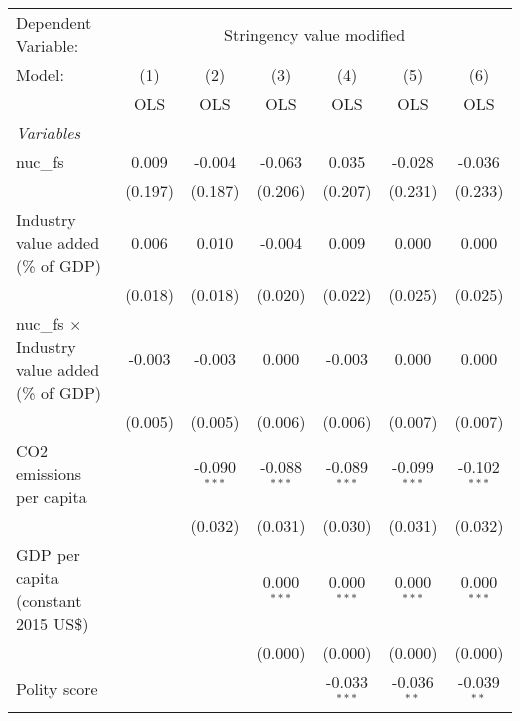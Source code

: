 
\begingroup
\centering
\begin{tabular}{lcccccc}
   \toprule
   Dependent Variable: & \multicolumn{6}{c}{Stringency value modified}\\
   Model:                                               & (1)     & (2)            & (3)            & (4)            & (5)            & (6)\\  
                                                        &  OLS    & OLS            & OLS            & OLS            & OLS            & OLS\\  
   \midrule
   \emph{Variables}\\
   nuc\_fs                                              & 0.009   & -0.004         & -0.063         & 0.035          & -0.028         & -0.036\\   
                                                        & (0.197) & (0.187)        & (0.206)        & (0.207)        & (0.231)        & (0.233)\\   
   Industry value added (\% of GDP)                     & 0.006   & 0.010          & -0.004         & 0.009          & 0.000          & 0.000\\   
                                                        & (0.018) & (0.018)        & (0.020)        & (0.022)        & (0.025)        & (0.025)\\   
   nuc\_fs $\times$ Industry value added (\% of GDP)    & -0.003  & -0.003         & 0.000          & -0.003         & 0.000          & 0.000\\   
                                                        & (0.005) & (0.005)        & (0.006)        & (0.006)        & (0.007)        & (0.007)\\   
   CO2 emissions per capita                             &         & -0.090$^{***}$ & -0.088$^{***}$ & -0.089$^{***}$ & -0.099$^{***}$ & -0.102$^{***}$\\   
                                                        &         & (0.032)        & (0.031)        & (0.030)        & (0.031)        & (0.032)\\   
   GDP per capita (constant 2015 US\$)                  &         &                & 0.000$^{***}$  & 0.000$^{***}$  & 0.000$^{***}$  & 0.000$^{***}$\\   
                                                        &         &                & (0.000)        & (0.000)        & (0.000)        & (0.000)\\   
   Polity score                                         &         &                &                & -0.033$^{***}$ & -0.036$^{**}$  & -0.039$^{**}$\\   

\end{tabular}
